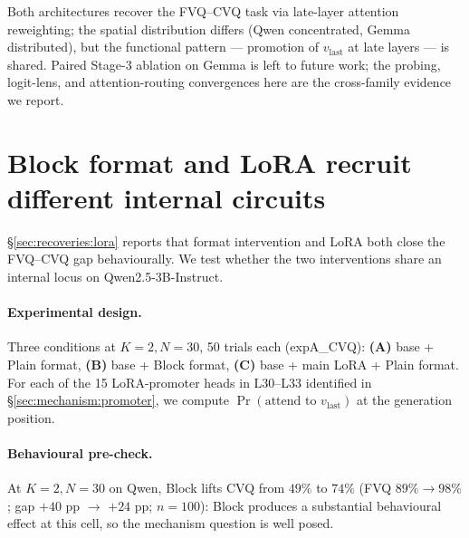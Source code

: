 \documentclass[11pt]{article}
\begin{document}
Both architectures recover the FVQ--CVQ task via late-layer
attention reweighting; the spatial distribution differs (Qwen
concentrated, Gemma distributed), but the functional pattern
--- promotion of $v_{\mathrm{last}}$ at late layers --- is shared.
Paired Stage-3 ablation on Gemma is left to future work; the
probing, logit-lens, and attention-routing convergences here are
the cross-family evidence we report.

\section{Block format and LoRA recruit different internal circuits}
\label{app:block_locus}

\S\ref{sec:recoveries:lora} reports that format intervention and
LoRA both close the FVQ--CVQ gap behaviourally. We test whether
the two interventions share an internal locus on
Qwen2.5-3B-Instruct.

\paragraph{Experimental design.}
Three conditions at $K{=}2, N{=}30$, 50 trials each (expA\_CVQ):
\textbf{(A)} base + Plain format, \textbf{(B)} base + Block format,
\textbf{(C)} base + main LoRA + Plain format. For each of the 15
LoRA-promoter heads in L30--L33 identified in
\S\ref{sec:mechanism:promoter}, we compute
$\Pr(\text{attend to }v_{\mathrm{last}})$ at the generation
position.

\paragraph{Behavioural pre-check.} At $K{=}2, N{=}30$ on Qwen,
Block lifts CVQ from $49\%$ to $74\%$ (FVQ $89\% \to 98\%$;
gap $+40$ pp $\to$ $+24$ pp; $n=100$): Block produces a
substantial behavioural effect at this cell, so the mechanism
question is well posed.
\end{document}
